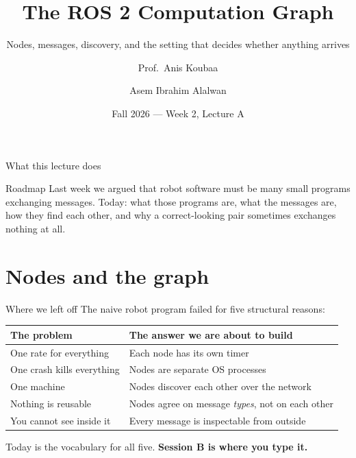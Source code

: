 \documentclass[aspectratio=169]{beamer}
\title[EE 414 --- Week 2A]{The ROS 2 Computation Graph}
\subtitle{Nodes, messages, discovery, and the setting that decides whether anything arrives}
\author[Koubaa \and Alalwan]{Prof.\ Anis Koubaa \and Asem Ibrahim Alalwan}
\institute[Alfaisal University]{
    EE 414 --- Introduction to Robotics\\
    College of Engineering\\
    Alfaisal University
}
\date{Fall 2026 --- Week 2, Lecture A}
\begin{document}
\begin{frame}[plain]
  \titlepage
\end{frame}

\begin{frame}{What this lecture does}
  \begin{block}{Roadmap}
    \small Last week we argued that robot software must be many small programs exchanging
    messages. Today: what those programs are, what the messages are, how they find each
    other, and why a correct-looking pair sometimes exchanges nothing at all.
  \end{block}
  \vspace{0.2em}
  {\scriptsize\tableofcontents[hideallsubsections]}
\end{frame}

\section{Nodes and the graph}

\begin{frame}{Where we left off}
  \small
  The naive robot program failed for five structural reasons:

  \vspace{0.4em}
  \begin{center}
  \begin{tabular}{@{}p{5.0cm}p{6.0cm}@{}}
    \toprule
    \textbf{The problem} & \textbf{The answer we are about to build} \\
    \midrule
    One rate for everything      & Each node has its own timer \\
    One crash kills everything   & Nodes are separate OS processes \\
    One machine                  & Nodes discover each other over the network \\
    Nothing is reusable          & Nodes agree on message \emph{types}, not on each other \\
    You cannot see inside it     & Every message is inspectable from outside \\
    \bottomrule
  \end{tabular}
  \end{center}

  \vspace{0.6em}
  Today is the vocabulary for all five. \textbf{Session B is where you type it.}
\end{frame}
\end{document}
